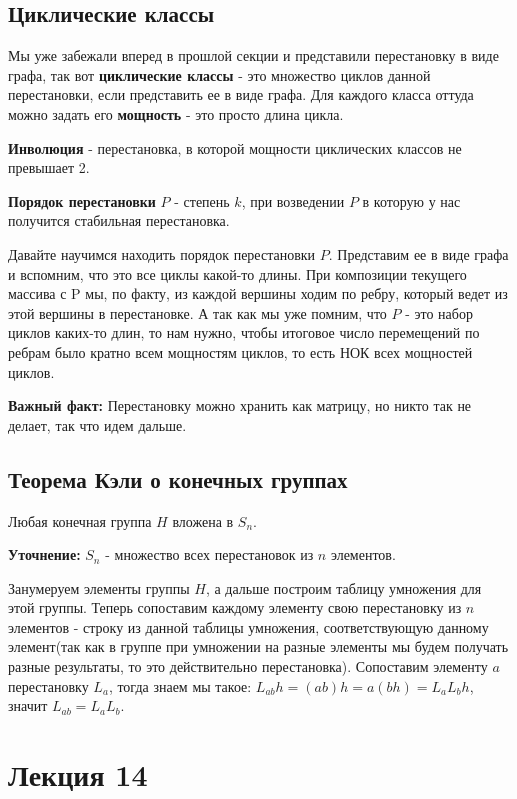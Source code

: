 \documentclass{article}
\begin{document}
\subsection{Циклические классы}
Мы уже забежали вперед в прошлой секции и представили перестановку в виде графа, так вот \textbf{циклические классы} - это множество циклов данной перестановки, если представить ее в виде графа. Для каждого класса оттуда можно задать его \textbf{мощность} - это просто длина цикла.

\textbf{Инволюция} - перестановка, в которой мощности циклических классов не превышает 2.

\textbf{Порядок перестановки} $P$ - степень $k$, при возведении $P$ в которую у нас получится стабильная перестановка.

Давайте научимся находить порядок перестановки $P$. Представим ее в виде графа и вспомним, что это все циклы какой-то длины. При композиции текущего массива с P мы, по факту, из каждой вершины ходим по ребру, который ведет из этой вершины в перестановке. А так как мы уже помним, что $P$ - это набор циклов каких-то длин, то нам нужно, чтобы итоговое число перемещений по ребрам было кратно всем мощностям циклов, то есть НОК всех мощностей циклов.

\textbf{Важный факт:} Перестановку можно хранить как матрицу, но никто так не делает, так что идем дальше.

\subsection{Теорема Кэли о конечных группах} 
Любая конечная группа $H$ вложена в $S_n$.

\textbf{Уточнение:} $S_n$ - множество всех перестановок из $n$ элементов.

Занумеруем элементы группы $H$, а дальше построим таблицу умножения для этой группы. Теперь сопоставим каждому элементу свою перестановку из $n$ элементов - строку из данной таблицы умножения, соответствующую данному элемент(так как в группе при умножении на разные элементы мы будем получать разные результаты, то это действительно перестановка). Сопоставим элементу $a$ перестановку $L_a$, тогда знаем мы такое: $L_{ab}h=(ab)h=a(bh)=L_aL_bh$, значит $L_{ab}=L_aL_b$.

\section{Лекция 14}
\end{document}
